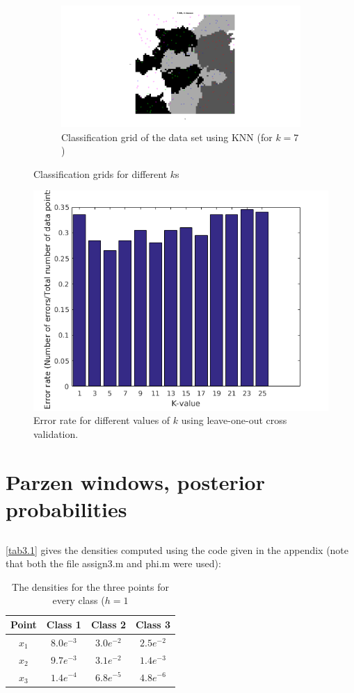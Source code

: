 \documentclass[10pt]{article}
\begin{document}
\begin{figure}[H]
\begin{subfigure}{.48\textwidth}
    \includegraphics[width=.8\textwidth]{assign2_4_7.png}
    \caption{Classification grid of the data set using KNN (for $k=7$)}
    \label{fig2.4d}
  \end{subfigure}
  \caption{Classification grids for different $k$s}
  \label{fig2.4_a}
\end{figure}

\begin{figure}[H]
 \centering
 \includegraphics[width=.7\textwidth]{assign2_4_b.png}
 \caption{Error rate for different values of $k$ using leave-one-out cross validation.}
 \label{fig2.4_b}
\end{figure}

\section{Parzen windows, posterior probabilities}
\subsection{}
\autoref{tab3.1} gives the densities computed using the code given in the appendix (note that both the file assign3.m and phi.m were used):

\begin{table}[H]
 \centering
 \caption{The densities for the three points for every class ($h=1$}
 \begin{tabular}{c|c|c|c}
  Point & Class 1 & Class 2 & Class 3 \\
  \hline
  $x_1$ & $8.0e^{-3}$ & $3.0e^{-2}$ & $2.5e^{-2}$ \\
  $x_2$ & $9.7e^{-3}$ & $3.1e^{-2}$ & $1.4e^{-3}$ \\
  $x_3$ & $1.4e^{-4}$ & $6.8e^{-5}$ & $4.8e^{-6}$ \\
 \end{tabular}
 \label{tab3.1}
\end{table}
\end{document}
